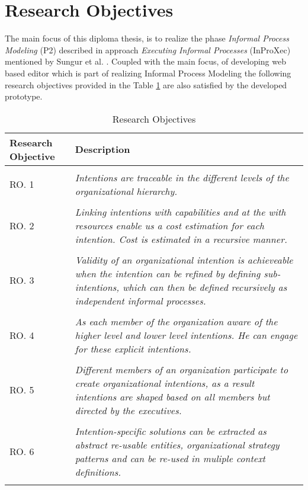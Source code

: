 \section {Research Objectives}
\label{sec:researchobjectives}
The main focus of this diploma thesis, is to realize the phase \textit{Informal Process Modeling} (P2) described in approach \textit{Executing Informal Processes} (InProXec) mentioned by Sungur et al. \cite{Sungur2015}. Coupled with the main focus, of developing web based editor which is part of realizing Informal Process Modeling the following research objectives provided in the Table \ref{tab:researchobjectives} are also satisfied by the developed prototype. 

\label{sec:researchobj}
\begin{center}
	\begin{longtable}{p{5cm}p{11cm}} 
   	\toprule 
	\textbf{Research Objective} & \textbf{Description} \\
	\midrule
	\endfirsthead
	\\
	RO. 1 & \textit{Intentions are traceable in the different levels of the organizational hierarchy. }  \label{ro1} \\
	\\[-1.5ex]
	RO. 2 & \textit{Linking intentions with capabilities and at the with resources enable us a cost estimation for each intention. Cost is estimated in a recursive manner.}  \label{ro2} \\
	\\[-1.5ex]
	RO. 3 & \textit{Validity of an organizational intention is achieveable when the intention can be refined by defining sub-intentions, which can then be defined recursively as independent informal processes.} \label{ro3}\\
	\\[-1.5ex]
	RO. 4 & \textit{As each member of the organization aware of the higher level and lower level intentions. He can engage for these explicit intentions. }  \label{ro4}\\
	\\[-1.5ex]
	RO. 5 & \textit{Different members of an organization participate to create organizational intentions, as a result intentions are shaped based on all members but directed by the executives.}\label{ro5}\\
	\\[-1.5ex]
	RO. 6 & \textit{Intention-specific solutions can be extracted as abstract re-usable entities, organizational strategy patterns and can be re-used in muliple context definitions.} \label{ro6}\\
	
	\bottomrule
	\caption{Research Objectives}
	\label{tab:researchobjectives}
	\end{longtable}	
\end{center}

